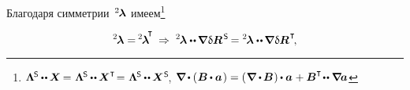 \begin{otherlanguage}{russian}
\vspace{-0.16em} Благодаря симметрии~${^2\hspace{-0.2ex}\bm{\lambda}}$ имеем\footnote{${%
\bm{\Lambda}^{\hspace{-0.16ex}\mathsf{S}} \hspace{-0.1ex} \dotdotp \hspace{-0.1ex} \bm{X} \hspace{-0.2ex} =
\hspace{.1ex} \bm{\Lambda}^{\hspace{-0.16ex}\mathsf{S}} \hspace{-0.1ex} \dotdotp \hspace{-0.1ex} \bm{X}^{\T} \hspace{-0.4ex} =
\hspace{.1ex} \bm{\Lambda}^{\hspace{-0.16ex}\mathsf{S}} \hspace{-0.1ex} \dotdotp \hspace{-0.1ex} \bm{X}^{\hspace{.08ex}\mathsf{S}}
\hspace{-0.25ex}}$,
\:\:
${%
\boldnabla \hspace{-0.1ex} \dotp \left( \hspace{.1ex} {\bm{B}} \hspace{-0.1ex} \dotp \bm{a} \hspace{.16ex} \right)
= \left( \hspace{.1ex} \boldnabla \dotp \hspace{-0.15ex} \bm{B} \hspace{.1ex} \right) \hspace{-0.1ex} \dotp \bm{a} \hspace{.1ex}
+ \bm{B}^{\T} \hspace{-0.3ex} \dotdotp \boldnabla \hspace{-0.15ex} \bm{a}
}$}

\nopagebreak\vspace{-0.2em}\begin{equation*}
{^2\hspace{-0.2ex}\bm{\lambda}} = \hspace{-0.2ex} {^2\hspace{-0.2ex}\bm{\lambda}}^{\hspace{-0.33ex}\T}
\: \Rightarrow \:
\hspace{.12ex}{^2\hspace{-0.2ex}\bm{\lambda}} \dotdotp \hspace{-0.15ex} \boldnabla \hspace{.1ex} \variation{\bm{R}}^{\hspace{.2ex}\mathsf{S}} \hspace{-0.2ex}
= {^2\hspace{-0.2ex}\bm{\lambda}} \dotdotp \hspace{-0.15ex} \boldnabla \hspace{.1ex} \variation{\bm{R}}^{\hspace{.15ex}\T}
\hspace{-0.33ex} ,
\end{equation*}


\end{otherlanguage}
